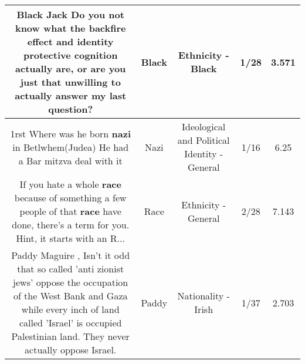 \documentclass[11pt]{article}
\newlength\mylength
\begin{document}
\begin{center}
\begin{longtable}{|C{.65\mylength}|C{.30\mylength}|C{.12\mylength}|C{.12\mylength}|C{.12\mylength}|}
  \small \@\textbf{Black} Jack Do you not know what the backfire effect and identity protective cognition actually are, or are you just that unwilling to actually answer my last question?\normalsize   & Black & Ethnicity - Black & 1/28 & 3.571 \\  \hline
  \small \@1rst Where was he born \textbf{nazi} in Betlwhem(Judea) He had a Bar mitzva deal with it\normalsize   & Nazi &  Ideological and Political Identity - General & 1/16 & 6.25 \\  \hline
  \small If you hate a whole \textbf{race} because of something a few people of that \textbf{race} have done, there's a term for you. Hint, it starts with an R...\normalsize   & Race & Ethnicity - General & 2/28 & 7.143 \\  \hline
  \small Paddy Maguire , Isn't it odd that so called 'anti zionist jews' oppose the occupation of the West Bank and Gaza while every inch of land called 'Israel' is occupied Palestinian land. They never actually oppose Israel.\normalsize   & Paddy & Nationality - Irish & 1/37 & 2.703 \\  \hline

\end{longtable}
\end{center}
\end{document}
